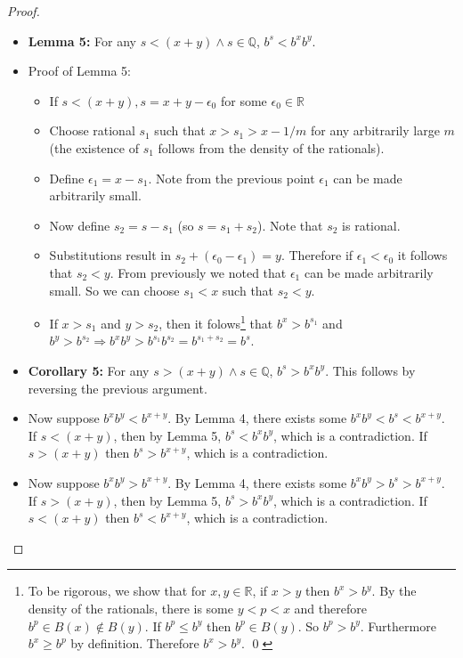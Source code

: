 \documentclass[12pt]{article}
\newcommand{\R}{\mathbb{R}}
\newcommand{\Q}{\mathbb{Q}}
\begin{document}
\begin{proof}
\begin{itemize}
    \item \textbf{Lemma 5:} For any $s < (x+y) \land s \in \Q$, $b^s < b^x b^y$.
        \item Proof of Lemma 5:
            \begin{itemize}
                \item If $s < (x+y), s = x+y-\epsilon_0$ for some $\epsilon_0 \in \R$
                \item Choose rational $s_1$ such that $x > s_1 > x - 1/m$ for any arbitrarily large $m$ (the existence of $s_1$ follows from the density of the rationals).
                \item Define $\epsilon_1 = x - s_1$. Note from the previous point $\epsilon_1$ can be made arbitrarily small.
                \item Now define $s_2 = s - s_1$ (so $s = s_1 + s_2$). Note that $s_2$ is rational.
                \item Substitutions result in $s_2 + (\epsilon_0 - \epsilon_1) = y$. Therefore if $\epsilon_1 < \epsilon_0$ it follows that $s_2 < y$. From previously we noted that $\epsilon_1$ can be made arbitrarily small. So we can choose $s_1 < x$ such that $s_2 < y$.
                \item If $x > s_1$ and $y > s_2$, then it folows\footnote{To be rigorous, we show that for $x, y \in \R$, if $x>y$ then $b^x > b^y$. By the density of the rationals, there is some $y < p < x$ and therefore $b^p \in B(x) \not\in B(y)$. If $b^p \leq b^y$ then $b^p \in B(y)$. So $b^p > b^y$. Furthermore $b^x \geq b^p$ by definition. Therefore $b^x > b^y$. \qed} that $b^x > b^{s_1}$ and $b^y > b^{s_2} \Rightarrow b^x b^y > b^{s_1} b^{s_2} = b^{s_1 + s_2} = b^s$.
            \end{itemize}
        \item \textbf{Corollary 5:} For any $s > (x+y) \land s \in \Q$, $b^s > b^x b^y$. This follows by reversing the previous argument.
        \item Now suppose $b^x b^y < b^{x+y}$. By Lemma 4, there exists some $b^x b^y <b^s< b^{x+y}$. If $s<(x+y)$, then by Lemma 5, $b^s < b^x b^y$, which is a contradiction. If $s>(x+y)$ then $b^s > b^{x+y}$, which is a contradiction.
        \item Now suppose $b^x b^y > b^{x+y}$. By Lemma 4, there exists some $b^x b^y > b^s > b^{x+y}$. If $s>(x+y)$, then by Lemma 5, $b^s > b^x b^y$, which is a contradiction. If $s<(x+y)$ then $b^s < b^{x+y}$, which is a contradiction.
    \end{itemize}
\end{proof}
\end{document}
